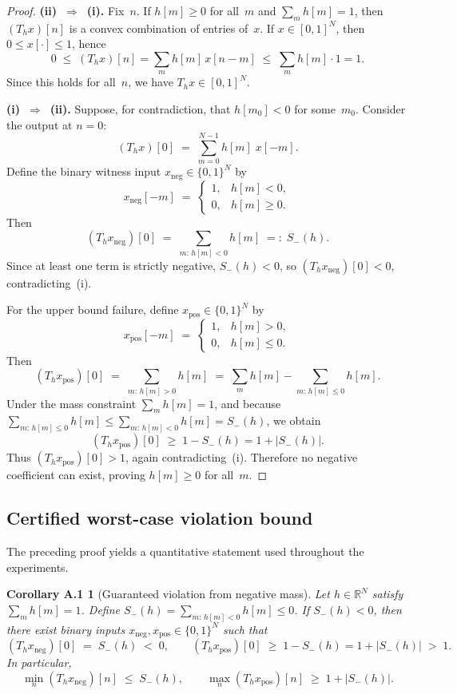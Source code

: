 \documentclass[11pt,a4paper]{article}
\theoremstyle{plain}
\theoremstyle{definition}
\theoremstyle{plain}
\newtheorem*{corollaryrestate}{Corollary A.1}
\newcommand{\R}{\mathbb{R}}
\newcommand{\xneg}{x_{\mathrm{neg}}}
\newcommand{\xpos}{x_{\mathrm{pos}}}
\newcommand{\Sminus}{S_{-}}
\begin{document}
\begin{proof}
\textbf{(ii)~$\Rightarrow$~(i).}\;
Fix~$n$.  If $h[m] \ge 0$ for all~$m$ and $\sum_m h[m] = 1$, then
$(T_h x)[n]$ is a convex combination of entries of~$x$.  If
$x \in [0,1]^N$, then $0 \le x[\cdot] \le 1$, hence
\[
  0
  \;\le\;
  (T_h x)[n]
  = \sum_m h[m]\,x[n-m]
  \;\le\;
  \sum_m h[m] \cdot 1
  = 1.
\]
Since this holds for all~$n$, we have $T_h x \in [0,1]^N$.

\medskip\noindent
\textbf{(i)~$\Rightarrow$~(ii).}\;
Suppose, for contradiction, that $h[m_0] < 0$ for some~$m_0$.  Consider the
output at $n = 0$:
\[
  (T_h x)[0]
  \;=\;
  \sum_{m=0}^{N-1} h[m]\; x[-m].
\]
Define the binary witness input $\xneg \in \{0,1\}^N$ by
\[
  \xneg[-m]
  \;=\;
  \begin{cases}
    1, & h[m] < 0,\\
    0, & h[m] \ge 0.
  \end{cases}
\]
Then
\[
  (T_h \xneg)[0]
  \;=\;
  \sum_{m:\,h[m]<0} h[m]
  \;=:\;
  \Sminus(h).
\]
Since at least one term is strictly negative, $\Sminus(h) < 0$, so
$(T_h \xneg)[0] < 0$, contradicting~(i).

For the upper bound failure, define $\xpos \in \{0,1\}^N$ by
\[
  \xpos[-m]
  \;=\;
  \begin{cases}
    1, & h[m] > 0,\\
    0, & h[m] \le 0.
  \end{cases}
\]
Then
\[
  (T_h \xpos)[0]
  \;=\;
  \sum_{m:\,h[m]>0} h[m]
  \;=\;
  \sum_m h[m] - \sum_{m:\,h[m] \le 0} h[m].
\]
Under the mass constraint $\sum_m h[m] = 1$, and because
$\sum_{m:\,h[m] \le 0} h[m] \le \sum_{m:\,h[m]<0} h[m] = \Sminus(h)$, we obtain
\[
  (T_h \xpos)[0]
  \;\ge\;
  1 - \Sminus(h)
  = 1 + |\Sminus(h)|.
\]
Thus $(T_h \xpos)[0] > 1$, again contradicting~(i).  Therefore no negative
coefficient can exist, proving $h[m] \ge 0$ for all~$m$.
\end{proof}


\subsection{Certified worst-case violation bound}
\label{app:violation-bound}

The preceding proof yields a quantitative statement used throughout the
experiments.

\begin{corollaryrestate}[Guaranteed violation from negative mass]
Let $h \in \R^N$ satisfy $\sum_m h[m] = 1$.  Define
$\Sminus(h) = \sum_{m:\,h[m]<0} h[m] \le 0$.  If $\Sminus(h) < 0$, then there
exist binary inputs $\xneg, \xpos \in \{0,1\}^N$ such that
\[
  (T_h \xneg)[0] \;=\; \Sminus(h) \;<\; 0,
  \qquad
  (T_h \xpos)[0] \;\ge\; 1 - \Sminus(h) = 1 + |\Sminus(h)| \;>\; 1.
\]
In particular,
\[
  \min_n (T_h \xneg)[n] \;\le\; \Sminus(h),
  \qquad
  \max_n (T_h \xpos)[n] \;\ge\; 1 + |\Sminus(h)|.
\]
\end{corollaryrestate}
\end{document}
